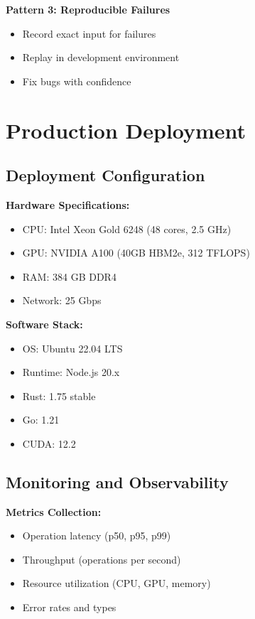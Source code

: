 \documentclass{article}
\begin{document}
\textbf{Pattern 3: Reproducible Failures}
\begin{itemize}
    \item Record exact input for failures
    \item Replay in development environment
    \item Fix bugs with confidence
\end{itemize}

\section{Production Deployment}

\subsection{Deployment Configuration}

\textbf{Hardware Specifications:}
\begin{itemize}
    \item CPU: Intel Xeon Gold 6248 (48 cores, 2.5 GHz)
    \item GPU: NVIDIA A100 (40GB HBM2e, 312 TFLOPS)
    \item RAM: 384 GB DDR4
    \item Network: 25 Gbps
\end{itemize}

\textbf{Software Stack:}
\begin{itemize}
    \item OS: Ubuntu 22.04 LTS
    \item Runtime: Node.js 20.x
    \item Rust: 1.75 stable
    \item Go: 1.21
    \item CUDA: 12.2
\end{itemize}

\subsection{Monitoring and Observability}

\textbf{Metrics Collection:}
\begin{itemize}
    \item Operation latency (p50, p95, p99)
    \item Throughput (operations per second)
    \item Resource utilization (CPU, GPU, memory)
    \item Error rates and types
\end{itemize}
\end{document}
